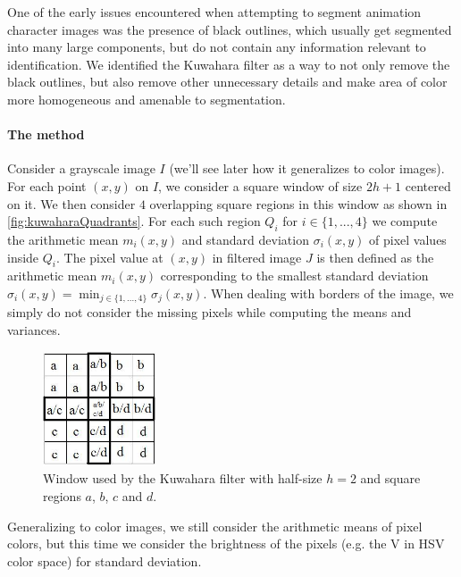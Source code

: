 One of the early issues encountered when attempting to segment animation character images was the presence of black outlines, which usually get segmented into many large components, but do not contain any information relevant to identification. We identified the Kuwahara filter \cite{kuwahara1976processing} as a way to not only remove the black outlines, but also remove other unnecessary details and make area of color more homogeneous and amenable to segmentation.

\paragraph{The method} Consider a grayscale image $I$ (we'll see later how it generalizes to color images). For each point $(x,y)$ on $I$, we consider a square window of size $2h + 1$ centered on it. We then consider $4$ overlapping square regions in this window as shown in \autoref{fig:kuwaharaQuadrants}. For each such region $Q_i$ for $i \in \{1, ..., 4\}$ we compute the arithmetic mean $m_i(x,y)$ and standard deviation $\sigma_i(x,y)$ of pixel values inside $Q_i$. The pixel value at $(x,y)$ in filtered image $J$ is then defined as the arithmetic mean $m_i(x,y)$ corresponding to the smallest standard deviation $\sigma_i(x,y) = \min_{j \in \{1, ..., 4\}}\sigma_j(x,y)$. When dealing with borders of the image, we simply do not consider the missing pixels while computing the means and variances.

\begin{figure}[htb!]
\centering
\includegraphics[width=0.3\textwidth]{images/kuwahara_quadrants.jpg}
\caption{Window used by the Kuwahara filter with half-size $h = 2$ and square regions $a$, $b$, $c$ and $d$.}
\label{fig:kuwaharaQuadrants}
\end{figure}

Generalizing to color images, we still consider the arithmetic means of pixel colors, but this time we consider the brightness of the pixels (e.g. the V in HSV color space) for standard deviation.

